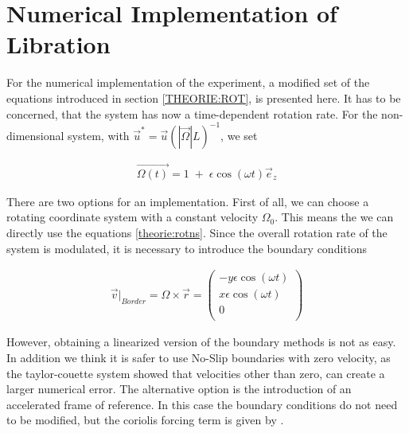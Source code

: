 \clearpage

\section{Numerical Implementation of Libration}

For the numerical implementation of the experiment, a modified set of the equations
introduced in section \ref{THEORIE:ROT}, is presented here.
It has to be concerned, that the system has now a time-dependent rotation rate.
For the non-dimensional system, with $\vec{u}^* =  \vec{u} (|\vec{\Omega}|L)^{-1}$, we set

\begin{align}
    \vec{\Omega(t)} = 1 \; + \; \epsilon \cos(\omega t)\vec{e}_z
\end{align}

There are two options for an implementation.
First of all, we can choose a rotating coordinate system with a constant velocity $\Omega_0$.
This means the we can directly use the equations \ref{theorie:rotns}. Since the overall rotation rate of the system is
modulated, it is necessary to introduce the boundary conditions

\begin{align}
    \vec{v}|_{Border}  = \Omega \times \vec{r} = \begin{pmatrix}
           -y \epsilon \cos(\omega t) \\
           x \epsilon \cos(\omega t) \\
           0\\
         \end{pmatrix}
\end{align}

However, obtaining a linearized version of the boundary methods is not as easy.
In addition we think it is safer to use No-Slip boundaries with zero velocity, as
the taylor-couette system showed that velocities other than zero, can create a larger numerical error.
The alternative option is the introduction of an accelerated frame of reference.
In this case the boundary conditions do not need to be modified, but the coriolis forcing term is given by \citep{Tilgner2007}.

